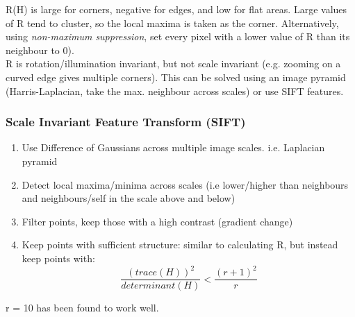 R(H) is large for corners, negative for edges, and low for flat areas. Large values of R tend to cluster, so the local maxima is taken as the corner. Alternatively, using \emph{non-maximum suppression}, set every pixel with a lower value of R than its neighbour to 0). \\

R is rotation/illumination invariant, but not scale invariant (e.g. zooming on a curved edge gives multiple corners). This can be solved using an image pyramid (Harris-Laplacian, take the max. neighbour across scales) or use SIFT features.

\subsubsection{Scale Invariant Feature Transform (SIFT)}
\begin{enumerate}
    \item Use Difference of Gaussians across multiple image scales. i.e. Laplacian pyramid
    \item Detect local maxima/minima across scales (i.e lower/higher than neighbours and neighbours/self in the scale above and below)
    \item Filter points, keep those with a high contrast (gradient change)
    \item Keep points with sufficient structure: similar to calculating R, but instead keep points with:
    \begin{equation}
        \frac{(trace(H))^2}{determinant(H)} < \frac{(r+1)^2}{r}
    \end{equation}
\end{enumerate}
r = 10 has been found to work well. 

